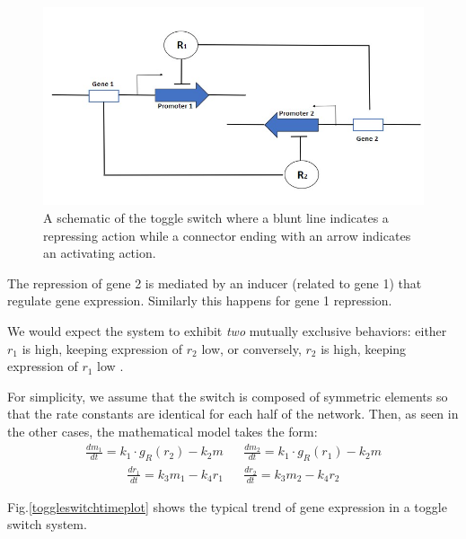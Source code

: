 \documentclass[12pt,a4paper]{report}
\begin{document}
\begin{figure}[!ht]
\centering
\includegraphics[scale=0.75]{toggleswitch.jpg}
\caption{A schematic of the toggle switch where a blunt line indicates a repressing action while a connector ending with an arrow indicates an activating action.}
\label{toggleswitch}
\end{figure}

The repression of gene 2 is mediated by an inducer (related to gene 1) that regulate gene expression. Similarly this happens for gene 1 repression.

We would expect the system to exhibit \emph{two} mutually exclusive behaviors: either $r_{1}$ is high, keeping expression of $r_{2}$ low, or conversely, $r_{2}$ is high, keeping expression of $r_{1}$ low \cite{SanDiegoUniversity}. 

For simplicity, we assume that the switch is composed of symmetric elements so that the rate constants are identical for each half of the network. Then, as seen in the other cases, the mathematical model takes the form:
\begin{align}
 \frac{dm_{1}}{dt}=k_{1}\cdot g_{R}(r_{2}) - k_{2}m && \frac{dm_{2}}{dt} = k_{1} \cdot g_{R}(r_{1}) - k_{2}m
\end{align}
\begin{align}
 \frac{dr_{1}}{dt}=k_{3}m_{1} - k_{4}r_{1} && \frac{dr_{2}}{dt} = k_{3}m_{2} - k_{4}r_{2}
\end{align}

Fig.\ref{toggleswitchtimeplot} shows the typical trend of gene expression in a toggle switch system.
\end{document}
